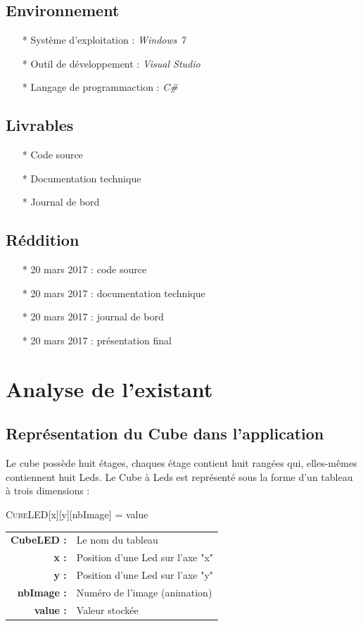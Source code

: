 \documentclass[a4paper,12pt]{article}
\begin{document}
\subsection{Environnement}
\begin{itemize}
	\item[*] Système d'exploitation : \emph{Windows 7}
	\item[*] Outil de développement : \emph{Visual Studio}
	\item[*] Langage de programmaction : \emph{C\#}
\end{itemize}

\subsection{Livrables}
\begin{itemize}
	\item[*] Code source
	\item[*] Documentation technique
	\item[*] Journal de bord
\end{itemize}

\subsection{Réddition}
\begin{itemize}
	\item[*] 20 mars 2017 : code source
	\item[*] 20 mars 2017 : documentation technique
	\item[*] 20 mars 2017 : journal de bord
	\item[*] 20 mars 2017 : présentation final
\end{itemize}
\newpage

\section{Analyse de l'existant}
\subsection{Représentation du Cube dans l'application}
\noindent Le cube possède huit étages, chaques étage contient huit rangées qui, elles-mêmes contiennent huit Leds. Le Cube à Leds est représenté sous la forme d'un tableau à trois dimensions :
\begin{center}
	\textsc{CubeLED}[x][y][nbImage] = value
\end{center}
\begin{center}
\begin{tabular}{r  l}
	\raggedright{\textbf{CubeLED :}} & Le nom du tableau\\
	\textbf{x :} & Position d'une Led sur l'axe "x"\\
	\textbf{y :} & Position d'une Led sur l'axe "y"\\
	\textbf{nbImage :} & Numéro de l'image (animation)\\
	\textbf{value :} & Valeur stockée\\
\end{tabular}
\end{center}
\end{document}
